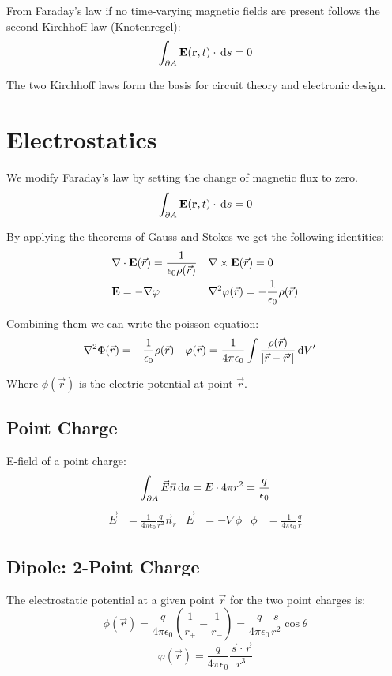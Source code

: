 \documentclass[a4paper, fontsize=8pt, landscape, DIV=1]{scrartcl}
\begin{document}
\begin{multicols*}{4}
  From Faraday's law if no time-varying magnetic fields are present follows the second Kirchhoff law (Knotenregel):
  \[ \int_{\partial A} \mathbf{E}(\mathbf{r},t)\cdot \,\mathrm{d} s = 0 \]

  The two Kirchhoff laws form the basis for circuit theory and electronic design.

  \section{Electrostatics}
  We modify Faraday's law by setting the change of magnetic flux to zero. 
  \[\int_{\partial A}\mathbf{E}(\mathbf{r},t)\cdot \,\mathrm{d} s = 0 \]

  By applying the theorems of Gauss and Stokes we get the following identities:
  \begin{align*}
    &\nabla \cdot \mathbf{E}(\vec{r}) = \frac{1}{\epsilon_0\rho(\vec{r})} & &\nabla\times\mathbf{E}(\vec{r}) = 0 \\
    &\mathbf{E} = -\nabla\varphi & &\nabla^2\varphi(\vec{r}) = -\frac{1}{\epsilon_0}\rho(\vec{r})
  \end{align*}

  Combining them we can write the poisson equation:
  \begin{align*}
    \nabla^2\Phi(\vec{r}) &= -\frac{1}{\epsilon_0}\rho(\vec{r}) &
    \varphi(\vec{r}) &= \frac{1}{4\pi\epsilon_0}\int\frac{\rho(\vec{r})}{|\vec{r}-\vec{r}'|}\,\mathrm{d} V'
  \end{align*}

  Where $\phi(\vec{r})$ is the electric potential at point $\vec{r}$.

  \subsection{Point Charge}
  E-field of a point charge:
    \[\int_{\partial A} \vec{E}\vec{n} \,\mathrm{d} a = E\cdot4\pi r^2 = \frac{q}{\epsilon_0} \]
  \begin{align*}
    \vec{E} &= \frac{1}{4\pi\epsilon_0}\frac{q}{r^2}\vec{n}_r & \vec{E}&=-\nabla\phi & \phi&=\frac{1}{4\pi\epsilon_0}\frac{q}{r}
  \end{align*}

  \subsection{Dipole: 2-Point Charge}
  The electrostatic potential at a given point $\vec{r}$ for the two point charges is:
  \[\phi(\vec{r}) = \frac{q}{4\pi\epsilon_0}\left(\frac{1}{r_+}-\frac{1}{r_-}\right) =\frac{q}{4\pi\epsilon_0}\frac{s}{r^2}\cos\theta \]
  \[\varphi(\vec{r}) = \frac{q}{4\pi\epsilon_0}\frac{\vec{s}\cdot\vec{r}}{r^3} \]


\end{multicols*}
\end{document}

